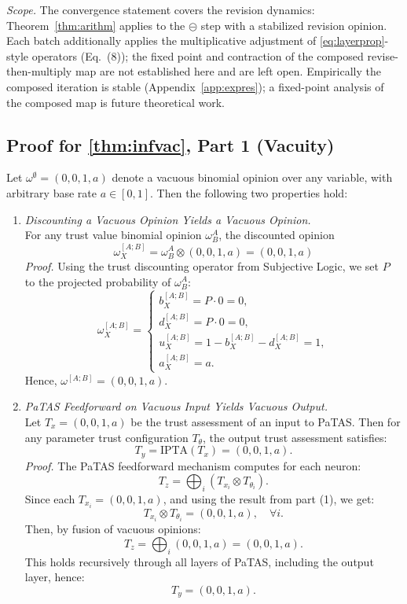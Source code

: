 \emph{Scope.} The convergence statement covers the revision dynamics: Theorem~\ref{thm:arithm} applies to the $\circleddash$ step with a stabilized revision opinion. Each batch additionally applies the multiplicative adjustment of \cref{eq:layerprop}-style operators (Eq.~(8)); the fixed point and contraction of the composed revise-then-multiply map are not established here and are left open. Empirically the composed iteration is stable (Appendix~\ref{app:expres}); a fixed-point analysis of the composed map is future theoretical work.





\subsection{Proof for \cref{thm:infvac}, Part 1 (Vacuity)}

Let \( \omega^\emptyset = (0, 0, 1, a) \) denote a vacuous binomial opinion over any variable, with arbitrary base rate \( a \in [0, 1] \). Then the following two properties hold:

\begin{enumerate}
    \item \emph{Discounting a Vacuous Opinion Yields a Vacuous Opinion.} \\
    For any trust value binomial opinion \(\omega^A_B \), the discounted opinion
    \[
    \omega^{[A;B]}_X = \omega^A_B \otimes (0,0,1,a)= (0,0,1,a)
    \]
    \textit{Proof.} Using the trust discounting operator from Subjective Logic, we set $P$ to the projected probability of \(\omega^A_B\):
    \[\omega^{[A;B]}_X = 
    \begin{cases}
    b^{[A;B]}_X = P\cdot 0 = 0, \\
    d^{[A;B]}_X = P\cdot 0 = 0, \\
    u^{[A;B]}_X = 1 - b^{[A;B]}_X-d^{[A;B]}_X = 1, \\
    a^{[A;B]}_X = a.
    \end{cases}
    \]
    Hence, \( \omega^{[A;B]} = (0,0,1,a) \).

    \item \emph{PaTAS Feedforward on Vacuous Input Yields Vacuous Output.} \\
    Let \( T_x = (0,0,1,a)\) be the trust assessment of an input to PaTAS. Then for any parameter trust configuration \( T_\theta \), the output trust assessment satisfies:
    \[
    T_y = \text{IPTA}(T_x) = (0,0,1,a).
    \]
    \textit{Proof.} The PaTAS feedforward mechanism computes for each neuron:
    \[
    T_z = \bigoplus_i \left( T_{x_i} \otimes T_{\theta_i} \right).
    \]
    Since each \( T_{x_i} = (0,0,1,a) \), and using the result from part (1), we get:
    \[
    T_{x_i} \otimes T_{\theta_i} = (0,0,1,a), \quad \forall i.
    \]
    Then, by fusion of vacuous opinions:
    \[
    T_z = \bigoplus_i (0,0,1,a) = (0,0,1,a).
    \]
    This holds recursively through all layers of PaTAS, including the output layer, hence:
    \[
    T_y = (0,0,1,a).
    \]
\end{enumerate}

